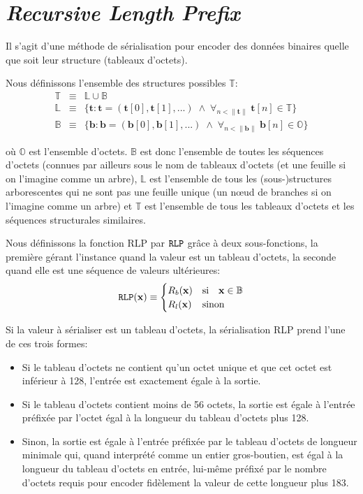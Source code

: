 \documentclass[9pt,oneside]{amsart}
\begin{document}
\section{\textit{Recursive Length Prefix}}\label{app:rlp}
Il s'agit d'une méthode de sérialisation pour encoder des données binaires quelle que soit leur structure (tableaux d'octets).

Nous définissons l'ensemble des structures possibles $\mathbb{T}$:
\begin{eqnarray}
\mathbb{T} & \equiv & \mathbb{L} \cup \mathbb{B} \\
\mathbb{L} & \equiv & \{ \mathbf{t}: \mathbf{t} = ( \mathbf{t}[0], \mathbf{t}[1], ... ) \; \wedge \; \forall_{n < \lVert \mathbf{t} \rVert} \; \mathbf{t}[n] \in \mathbb{T} \} \\
\mathbb{B} & \equiv & \{ \mathbf{b}: \mathbf{b} = ( \mathbf{b}[0], \mathbf{b}[1], ... ) \; \wedge \; \forall_{n < \lVert \mathbf{b} \rVert} \; \mathbf{b}[n] \in \mathbb{O} \}
\end{eqnarray}

où $\mathbb{O}$ est l'ensemble d'octets. $\mathbb{B}$  est donc l'ensemble de toutes les séquences d'octets (connues par ailleurs sous le nom de tableaux d'octets (et une feuille si on l'imagine comme un arbre), $\mathbb{L}$ est l'ensemble de tous les (sous-)structures arborescentes qui ne sont pas une feuille unique (un n\oe{}ud de branches si on l'imagine comme un arbre) et  $\mathbb{T}$ est l'ensemble de tous les tableaux d'octets et les séquences structurales similaires.

Nous définissons la fonction RLP par $\mathtt{\tiny RLP}$ grâce à deux sous-fonctions, la première gérant l'instance quand la valeur est un tableau d'octets, la seconde quand elle est une séquence de valeurs ultérieures:
\begin{equation}
\mathtt{\tiny RLP}(\mathbf{x}) \equiv \begin{cases} R_b(\mathbf{x}) & \text{si} \quad \mathbf{x} \in \mathbb{B} \\ R_l(\mathbf{x}) & \text{sinon} \end{cases}
\end{equation}

Si la valeur à sérialiser est un tableau d'octets, la sérialisation RLP prend l'une de ces trois formes:

\begin{itemize}
\item
  Si le tableau d'octets ne contient qu'un octet unique et que cet octet est inférieur à 128, l'entrée est exactement égale à la sortie.
\item
  Si le tableau d'octets contient moins de 56 octets, la sortie est égale à l'entrée préfixée par l'octet égal à la longueur du tableau d'octets plus 128.
\item
  Sinon, la sortie est égale à l'entrée préfixée par le tableau d'octets de longueur minimale qui, quand interprété comme un entier gros-boutien, est égal à la longueur du tableau d'octets en entrée, lui-même préfixé par le nombre d'octets requis pour encoder fidèlement la valeur de cette longueur plus 183.
\end{itemize}
\end{document}
